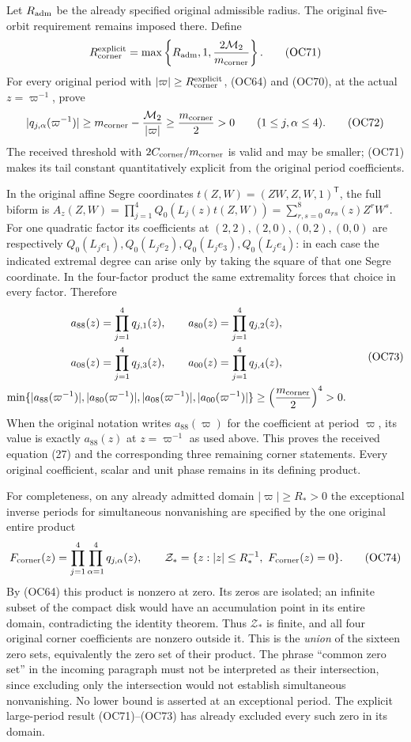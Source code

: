 Let $R_{\rm adm}$ be the already specified original admissible radius.
The original five-orbit requirement remains imposed there. Define
\[
 R_{\rm corner}^{\rm explicit}
   =\max\left\{R_{\rm adm},1,
                      \frac{2\mathcal M_2}{m_{\rm corner}}\right\}.
 \tag{OC71}\label{eq:OC71}
\]
For every original period with $|\varpi|\ge
R_{\rm corner}^{\rm explicit}$, (OC64) and (OC70), at the actual
$z=\varpi^{-1}$, prove
\[
 |q_{j,\alpha}(\varpi^{-1})|
 \ge m_{\rm corner}-\frac{\mathcal M_2}{|\varpi|}
 \ge\frac{m_{\rm corner}}2>0
            \qquad(1\le j,\alpha\le4).
 \tag{OC72}\label{eq:OC72}
\]
The received threshold with $2C_{\rm corner}/m_{\rm corner}$ is
valid and may be smaller; (OC71) makes its tail constant quantitatively
explicit from the original period coefficients.

In the original affine Segre coordinates $t(Z,W)=(ZW,Z,W,1)^{\mathsf T}$,
the full biform is
$A_z(Z,W)=\prod_{j=1}^4Q_0(L_j(z)t(Z,W))
 =\sum_{r,s=0}^8a_{rs}(z)Z^rW^s$.
For one quadratic factor its coefficients at $(2,2),(2,0),(0,2),(0,0)$
are respectively $Q_0(L_je_1),Q_0(L_je_2),Q_0(L_je_3),Q_0(L_je_4)$:
in each case the indicated extremal degree can arise only by taking the
square of that one Segre coordinate. In the four-factor product the
same extremality forces that choice in every factor. Therefore
\[
 \begin{gathered}
 a_{88}(z)=\prod_{j=1}^4q_{j,1}(z),\qquad
 a_{80}(z)=\prod_{j=1}^4q_{j,2}(z),\\
 a_{08}(z)=\prod_{j=1}^4q_{j,3}(z),\qquad
 a_{00}(z)=\prod_{j=1}^4q_{j,4}(z),\\
 \min\{|a_{88}(\varpi^{-1})|,|a_{80}(\varpi^{-1})|,
          |a_{08}(\varpi^{-1})|,|a_{00}(\varpi^{-1})|\}
       \ge\left(\frac{m_{\rm corner}}2\right)^4>0.
 \end{gathered}\tag{OC73}\label{eq:OC73}
\]
When the original notation writes $a_{88}(\varpi)$ for the coefficient
at period $\varpi$, its value is exactly $a_{88}(z)$ at
$z=\varpi^{-1}$ as used above. This proves the received equation (27)
and the corresponding three remaining corner statements. Every original
coefficient, scalar and unit phase remains in its defining product.

For completeness, on any already admitted domain $|\varpi|\ge R_*>0$
the exceptional inverse periods for simultaneous nonvanishing are
specified by the one original entire product
\[
 F_{\rm corner}(z)=\prod_{j=1}^4\prod_{\alpha=1}^4q_{j,\alpha}(z),
 \qquad
 \mathcal Z_*=
 \{z:|z|\le R_*^{-1},\ F_{\rm corner}(z)=0\}.
 \tag{OC74}\label{eq:OC74}
\]
By (OC64) this product is nonzero at zero. Its zeros are isolated;
an infinite subset of the compact disk would have an accumulation point
in its entire domain, contradicting the identity theorem. Thus
$\mathcal Z_*$ is finite, and all four original corner coefficients
are nonzero outside it. This is the \emph{union} of the sixteen
zero sets, equivalently the zero set of their product. The phrase
``common zero set'' in the incoming paragraph must not be interpreted as
their intersection, since excluding only the intersection would not
establish simultaneous nonvanishing. No lower bound is asserted at an
exceptional period. The explicit large-period result (OC71)--(OC73)
has already excluded every such zero in its domain.

